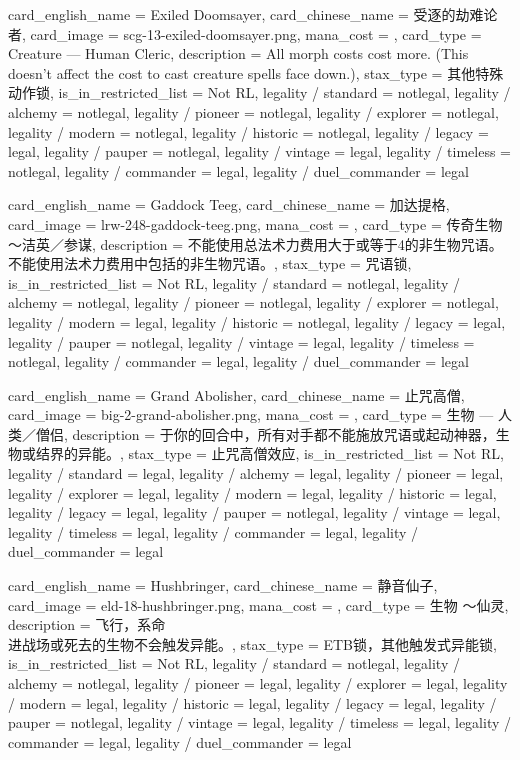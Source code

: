 \documentclass[lang = cn, color = black, 10pt]{AllThatStax}
\begin{document}
\card
{
	card_english_name = {Exiled Doomsayer},
	card_chinese_name = {受逐的劫难论者},
	card_image = scg-13-exiled-doomsayer.png,
	mana_cost = ,
	card_type = Creature — Human Cleric,
	description = {All morph costs cost  more. (This doesn't affect the cost to cast creature spells face down.)},
	stax_type = 其他特殊动作锁,
	is_in_restricted_list = Not RL,
	legality / standard = notlegal,
	legality / alchemy = notlegal,
	legality / pioneer = notlegal,
	legality / explorer = notlegal,
	legality / modern = notlegal,
	legality / historic = notlegal,
	legality / legacy = legal,
	legality / pauper = notlegal,
	legality / vintage = legal,
	legality / timeless = notlegal,
	legality / commander = legal,
	legality / duel_commander = legal
}

\card
{
	card_english_name = {Gaddock Teeg},
	card_chinese_name = {加达提格},
	card_image = lrw-248-gaddock-teeg.png,
	mana_cost = ,
	card_type = 传奇生物～洁英／参谋,
	description = {不能使用总法术力费用大于或等于4的非生物咒语。\\
		不能使用法术力费用中包括的非生物咒语。},
	stax_type = 咒语锁,
	is_in_restricted_list = Not RL,
	legality / standard = notlegal,
	legality / alchemy = notlegal,
	legality / pioneer = notlegal,
	legality / explorer = notlegal,
	legality / modern = legal,
	legality / historic = notlegal,
	legality / legacy = legal,
	legality / pauper = notlegal,
	legality / vintage = legal,
	legality / timeless = notlegal,
	legality / commander = legal,
	legality / duel_commander = legal
}

\card
{
	card_english_name = {Grand Abolisher},
	card_chinese_name = {止咒高僧},
	card_image = big-2-grand-abolisher.png,
	mana_cost = ,
	card_type = 生物 — 人类／僧侣,
	description = {于你的回合中，所有对手都不能施放咒语或起动神器，生物或结界的异能。},
	stax_type = 止咒高僧效应,
	is_in_restricted_list = Not RL,
	legality / standard = legal,
	legality / alchemy = legal,
	legality / pioneer = legal,
	legality / explorer = legal,
	legality / modern = legal,
	legality / historic = legal,
	legality / legacy = legal,
	legality / pauper = notlegal,
	legality / vintage = legal,
	legality / timeless = legal,
	legality / commander = legal,
	legality / duel_commander = legal
}

\card
{
	card_english_name = {Hushbringer},
	card_chinese_name = {静音仙子},
	card_image = eld-18-hushbringer.png,
	mana_cost = ,
	card_type = 生物 ～仙灵,
	description = {飞行，系命\\
		进战场或死去的生物不会触发异能。},
	stax_type = ETB锁，其他触发式异能锁,
	is_in_restricted_list = Not RL,
	legality / standard = notlegal,
	legality / alchemy = notlegal,
	legality / pioneer = legal,
	legality / explorer = legal,
	legality / modern = legal,
	legality / historic = legal,
	legality / legacy = legal,
	legality / pauper = notlegal,
	legality / vintage = legal,
	legality / timeless = legal,
	legality / commander = legal,
	legality / duel_commander = legal
}
\end{document}
